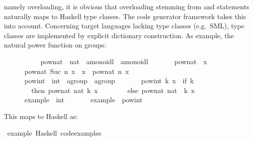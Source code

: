 \begin{isabellebody}
\begin{isamarkuptext}
  namely overloading, it is obvious that overloading
  stemming from \isa{{\isasymCLASS}} and \isa{{\isasymINSTANCE}}
  statements naturally maps to Haskell type classes.
  The code generator framework \cite{isabelle-codegen} 
  takes this into account.  Concerning target languages
  lacking type classes (e.g.~SML), type classes
  are implemented by explicit dictionary construction.
  As example, the natural power function on groups:%
\end{isamarkuptext}%
\isamarkuptrue%
\ \ \ \ \isamarkupfalse%
\isanewline
\ \ \ \ \ \ pow{\isacharunderscore}nat\ {\isacharcolon}{\isacharcolon}\ {\isachardoublequoteopen}nat\ {\isasymRightarrow}\ {\isacharprime}a{\isasymColon}monoidl\ {\isasymRightarrow}\ {\isacharprime}a{\isasymColon}monoidl{\isachardoublequoteclose}\ \isanewline
\ \ \ \ \ \ {\isachardoublequoteopen}pow{\isacharunderscore}nat\ {}\ x\ {\isacharequal}\ {\isasymone}{\isachardoublequoteclose}\isanewline
\ \ \ \ \ \ {\isachardoublequoteopen}pow{\isacharunderscore}nat\ {\isacharparenleft}Suc\ n{\isacharparenright}\ x\ {\isacharequal}\ x\ {\isasymotimes}\ pow{\isacharunderscore}nat\ n\ x{\isachardoublequoteclose}\isanewline
\isanewline
\ \ \ \ \isamarkupfalse%
\isanewline
\ \ \ \ \ \ pow{\isacharunderscore}int\ {\isacharcolon}{\isacharcolon}\ {\isachardoublequoteopen}int\ {\isasymRightarrow}\ {\isacharprime}a{\isasymColon}group\ {\isasymRightarrow}\ {\isacharprime}a{\isasymColon}group{\isachardoublequoteclose}\ \isanewline
\ \ \ \ \ \ {\isachardoublequoteopen}pow{\isacharunderscore}int\ k\ x\ {\isacharequal}\ {\isacharparenleft}if\ k\ {\isachargreater}{\isacharequal}\ {}\isanewline
\ \ \ \ \ \ \ \ then\ pow{\isacharunderscore}nat\ {\isacharparenleft}nat\ k{\isacharparenright}\ x\isanewline
\ \ \ \ \ \ \ \ else\ {\isacharparenleft}pow{\isacharunderscore}nat\ {\isacharparenleft}nat\ {\isacharparenleft}{\isacharminus}\ k{\isacharparenright}{\isacharparenright}\ x{\isacharparenright}{\isasymdiv}{\isacharparenright}{\isachardoublequoteclose}\isanewline
\isanewline
\ \ \ \ \isamarkupfalse%
\isanewline
\ \ \ \ \ \ example\ {\isacharcolon}{\isacharcolon}\ int\ \isanewline
\ \ \ \ \ \ {\isachardoublequoteopen}example\ {\isacharequal}\ pow{\isacharunderscore}int\ {}{}\ {\isacharparenleft}{\isacharminus}{}{\isacharparenright}{\isachardoublequoteclose}%
\begin{isamarkuptext}%
\noindent This maps to Haskell as:%
\end{isamarkuptext}%
\isamarkuptrue%
\isamarkupfalse%
\ example\ {\isacharparenleft}Haskell\ {\isachardoublequoteopen}code{\isacharunderscore}examples{\isacharslash}{\isachardoublequoteclose}{\isacharparenright}%
\begin{isamarkuptext}%


\end{isamarkuptext}
\end{isabellebody}
